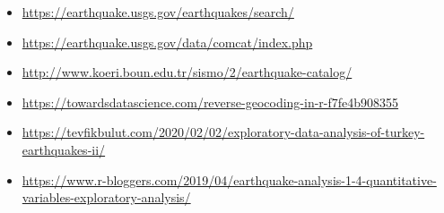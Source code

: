 \documentclass[
]{article}
\providecommand{\tightlist}{%
  \setlength{\itemsep}{0pt}\setlength{\parskip}{0pt}}
\begin{document}
\begin{itemize}
\tightlist
\item
  \url{https://earthquake.usgs.gov/earthquakes/search/}
\item
  \url{https://earthquake.usgs.gov/data/comcat/index.php}
\item
  \url{http://www.koeri.boun.edu.tr/sismo/2/earthquake-catalog/}
\item
  \url{https://towardsdatascience.com/reverse-geocoding-in-r-f7fe4b908355}
\item
  \url{https://tevfikbulut.com/2020/02/02/exploratory-data-analysis-of-turkey-earthquakes-ii/}
\item
  \url{https://www.r-bloggers.com/2019/04/earthquake-analysis-1-4-quantitative-variables-exploratory-analysis/}
\end{itemize}
\end{document}
